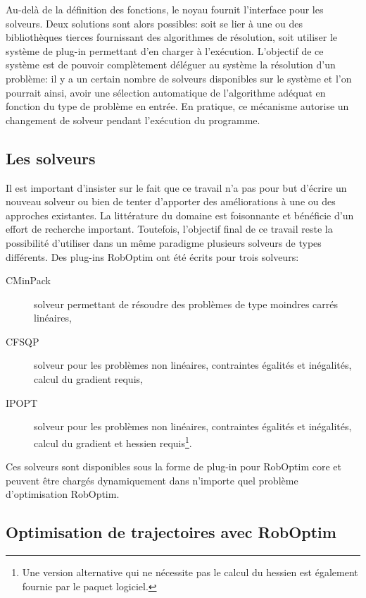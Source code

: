 Au-delà de la définition des fonctions, le noyau fournit l'interface
pour les solveurs. Deux solutions sont alors possibles: soit se lier à
une ou des bibliothèques tierces fournissant des algorithmes de
résolution, soit utiliser le système de plug-in
permettant d'en charger à l'exécution. L'objectif de ce système est de
pouvoir complètement déléguer au système la résolution d'un problème:
il y a un certain nombre de solveurs disponibles sur le système et
l'on pourrait ainsi, avoir une sélection automatique de l'algorithme
adéquat en fonction du type de problème en entrée. En pratique, ce
mécanisme autorise un changement de solveur pendant l'exécution du
programme.


\subsection{Les solveurs}
\label{sec:chap1_roboptim_solv}


Il est important d'insister sur le fait que ce travail n'a pas pour
but d'écrire un nouveau solveur ou bien de tenter d'apporter des
améliorations à une ou des approches existantes. La littérature du
domaine est foisonnante et bénéficie d'un effort de recherche
important. Toutefois, l'objectif final de ce travail reste la
possibilité d'utiliser dans un même paradigme plusieurs solveurs de
types différents. Des plug-ins RobOptim ont été écrits pour trois
solveurs:
%
\begin{description}
\item[CMinPack] solveur permettant de résoudre des problèmes de type
  moindres carrés linéaires,
\item[CFSQP] solveur pour les problèmes non linéaires, contraintes
  égalités et inégalités, calcul du gradient requis,
\item[IPOPT] solveur pour les problèmes non linéaires, contraintes
  égalités et inégalités, calcul du gradient et hessien
  requis\footnote{Une version alternative qui ne nécessite pas le
    calcul du hessien est également fournie par le paquet logiciel.}.
\end{description}

Ces solveurs sont disponibles sous la forme de plug-in pour RobOptim
core et peuvent être chargés dynamiquement dans n'importe quel
problème d'optimisation RobOptim.


\subsection{Optimisation de trajectoires avec RobOptim}
\label{sec:chap1_roboptim_optim}

